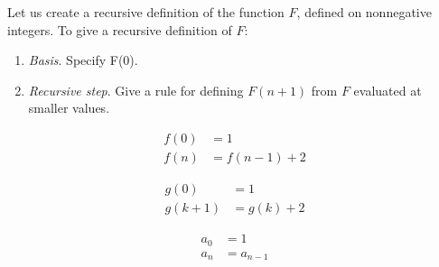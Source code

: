 Let us create a recursive definition of the function $F$, defined on nonnegative integers. To give a recursive definition of $F$:
\begin{enumerate}\item \emph{Basis}. Specify F(0).
    \item \emph{Recursive step}. Give a rule for defining $F(n+1)$ from $F$ evaluated at smaller values.
\end{enumerate}
\begin{ex}
  \begin{align*}
    f(0) &= 1 \\
    f(n) &= f(n-1) +2
  \end{align*}
\end{ex}
\begin{ex}
  \begin{align*}
    g(0) &= 1 \\
    g(k+1) &= g(k)+2
  \end{align*}
\end{ex}
\begin{ex}
  \begin{align*}
    a_0 &= 1 \\
    a_n &= a_{n-1}
  \end{align*}
\end{ex}

